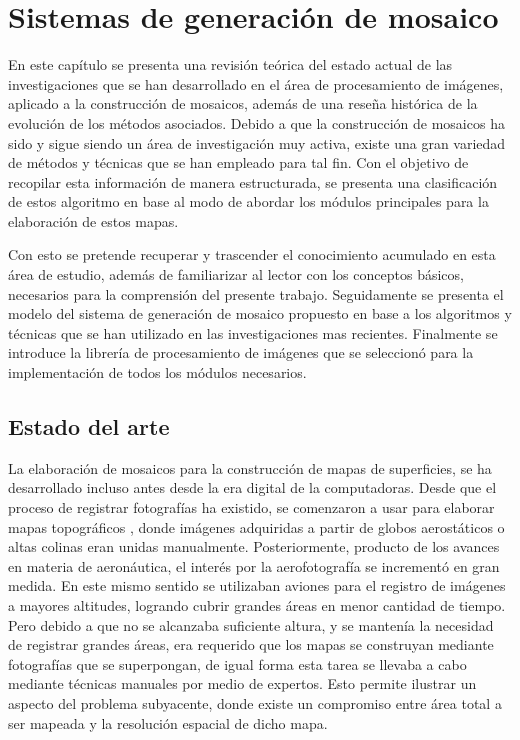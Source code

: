 \chapter{Sistemas de generación de mosaico}
\label{capitulo2}

En este capítulo se presenta una revisión teórica del estado actual de las investigaciones que se han desarrollado en el área de procesamiento de imágenes, aplicado a la construcción de mosaicos, además de una reseña histórica de la evolución de los métodos asociados. Debido a que la construcción de mosaicos ha sido y sigue siendo un área de investigación muy activa, existe una gran variedad de métodos y técnicas que se han empleado para tal fin. Con el objetivo de recopilar esta información de manera estructurada, se presenta una clasificación de estos algoritmo en base al modo de abordar los módulos principales para la elaboración de estos mapas.

Con esto se pretende recuperar y trascender el conocimiento acumulado en esta área de estudio, además de familiarizar al lector con los conceptos básicos, necesarios para la comprensión del presente trabajo. Seguidamente se presenta el modelo del sistema de generación de mosaico propuesto en base a los algoritmos y técnicas que se han utilizado en las investigaciones mas recientes. Finalmente se introduce la librería de procesamiento de imágenes que se seleccionó para la implementación de todos los módulos necesarios.

\section{Estado del arte}

La elaboración de mosaicos para la construcción de mapas de superficies, se ha desarrollado incluso antes desde la era digital de la computadoras. Desde que el proceso de registrar fotografías ha existido, se comenzaron a usar para elaborar mapas topográficos \cite{primeros-mapas}, donde imágenes adquiridas a partir de globos aerostáticos o altas colinas eran unidas manualmente. Posteriormente, producto de los avances en materia de aeronáutica, el interés por la aerofotografía se incrementó en gran medida. En este mismo sentido se utilizaban aviones para el registro de imágenes a mayores altitudes, logrando cubrir grandes áreas en menor cantidad de tiempo. Pero debido a que no se alcanzaba suficiente altura, y se mantenía la necesidad de registrar grandes áreas, era requerido que los mapas se construyan mediante fotografías que se superpongan, de igual forma esta tarea se llevaba a cabo mediante técnicas manuales por medio de expertos. Esto permite ilustrar un aspecto del problema subyacente, donde existe un compromiso entre área total a ser mapeada y la resolución espacial de dicho mapa.

